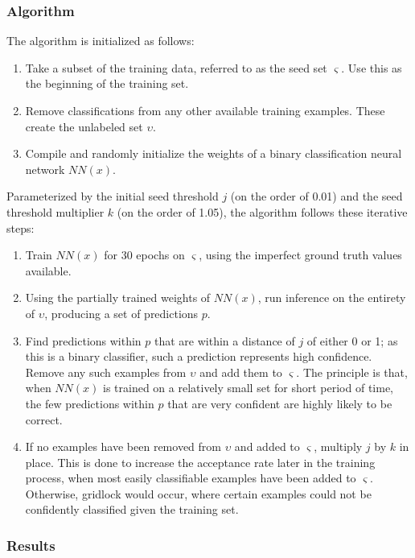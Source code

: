 \documentclass[10pt]{article}
\begin{document}
\subsubsection{Algorithm}

The algorithm is initialized as follows:

\begin{enumerate}
    \item Take a subset of the training data, referred to as the seed set $\varsigma$. Use this as the beginning of the training set.
    \item Remove classifications from any other available training examples. These create the unlabeled set $\upsilon$.
    \item Compile and randomly initialize the weights of a binary classification neural network $NN(x)$.
\end{enumerate}

Parameterized by the initial seed threshold $j$ (on the order of 0.01) and the seed threshold multiplier $k$ (on the order of 1.05), the algorithm follows these iterative steps:

\begin{enumerate}
    \item Train $NN(x)$ for 30 epochs on $\varsigma$, using the imperfect ground truth values available.
    \item Using the partially trained weights of $NN(x)$, run inference on the entirety of $\upsilon$, producing a set of predictions $p$.
    \item Find predictions within $p$ that are within a distance of $j$ of either 0 or 1; as this is a binary classifier, such a prediction represents high confidence. Remove any such examples from $\upsilon$ and add them to $\varsigma$. The principle is that, when $NN(x)$ is trained on a relatively small set for short period of time, the few predictions within $p$ that are very confident are highly likely to be correct.
    \item If no examples have been removed from $\upsilon$ and added to $\varsigma$, multiply $j$ by $k$ in place. This is done to increase the acceptance rate later in the training process, when most easily classifiable examples have been added to $\varsigma$. Otherwise, gridlock would occur, where certain examples could not be confidently classified given the training set.
\end{enumerate}

\subsubsection{Results}
\end{document}
